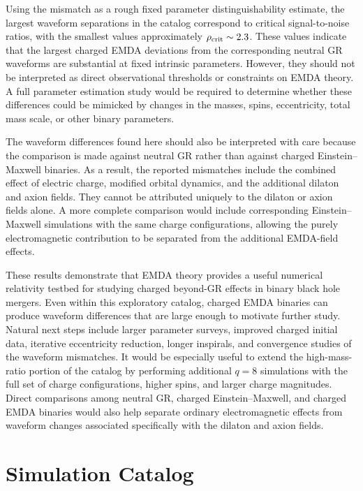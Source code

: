 Using the mismatch as a rough fixed parameter distinguishability estimate, the largest waveform separations in the catalog correspond to critical signal-to-noise ratios, with the smallest values approximately $\rho_{\rm crit}\sim2.3$. These values indicate that the largest charged EMDA deviations from the corresponding neutral GR waveforms are substantial at fixed intrinsic parameters. However, they should not be interpreted as direct observational thresholds or constraints on EMDA theory. A full parameter estimation study would be required to determine whether these differences could be mimicked by changes in the masses, spins, eccentricity, total mass scale, or other binary parameters.

The waveform differences found here should also be interpreted with care because the comparison is made against neutral GR rather than against charged Einstein--Maxwell binaries. As a result, the reported mismatches include the combined effect of electric charge, modified orbital dynamics, and the additional dilaton and axion fields. They cannot be attributed uniquely to the dilaton or axion fields alone. A more complete comparison would include corresponding Einstein--Maxwell simulations with the same charge configurations, allowing the purely electromagnetic contribution to be separated from the additional EMDA-field effects.

These results demonstrate that EMDA theory provides a useful numerical relativity testbed for studying charged beyond-GR effects in binary black hole mergers. Even within this exploratory catalog, charged EMDA binaries can produce waveform differences that are large enough to motivate further study. Natural next steps include larger parameter surveys, improved charged initial data, iterative eccentricity reduction, longer inspirals, and convergence studies of the waveform mismatches. It would be especially useful to extend the high-mass-ratio portion of the catalog by performing additional $q=8$ simulations with the full set of charge configurations, higher spins, and larger charge magnitudes. Direct comparisons among neutral GR, charged Einstein--Maxwell, and charged EMDA binaries would also help separate ordinary electromagnetic effects from waveform changes associated specifically with the dilaton and axion fields.
\section{Simulation Catalog}
\label{sec:simulation_catalog}

